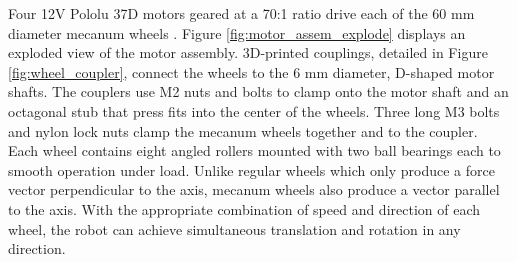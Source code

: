 Four 12V Pololu 37D motors geared at a 70:1 ratio drive each of the 60 mm diameter mecanum wheels \cite{pololu}. Figure \ref{fig:motor_assem_explode} displays an exploded view of the motor assembly. 3D-printed couplings, detailed in Figure \ref{fig:wheel_coupler}, connect the wheels to the 6 mm diameter, D-shaped motor shafts. The couplers use M2 nuts and bolts to clamp onto the motor shaft and an octagonal stub that press fits into the center of the wheels. Three long M3 bolts and nylon lock nuts clamp the mecanum wheels together and to the coupler. Each wheel contains eight angled rollers mounted with two ball bearings each to smooth operation under load. Unlike regular wheels which only produce a force vector perpendicular to the axis, mecanum wheels also produce a vector parallel to the axis. With the appropriate combination of speed and direction of each wheel, the robot can achieve simultaneous translation and rotation in any direction. 

